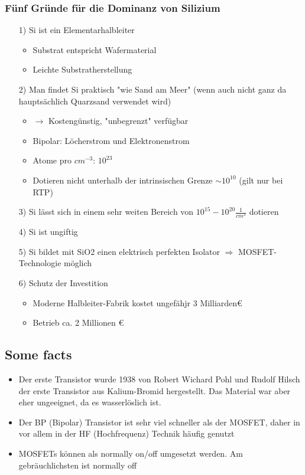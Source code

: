 \documentclass[12pt,a4paper]{report}%
\numberwithin{equation}{section}
\def\€{\euro{}}
\numberwithin{equation}{subsection}
\begin{document}
		\subsubsection{Fünf Gründe für die Dominanz von Silizium}
		\begin{itemize}
		  \item[1) ] Si ist ein Elementarhalbleiter
		  \begin{itemize}
		    \item Substrat entspricht Wafermaterial
		    \item Leichte Substratherstellung
		  \end{itemize}
		  \item[2) ] Man findet Si praktisch "wie Sand am Meer" (wenn auch nicht ganz da hauptsächlich Quarzsand verwendet wird)
		  \begin{itemize}
		    \item $\rightarrow$ Kostengünstig, "unbegrenzt" verfügbar
		    \item Bipolar: Löcherstrom und Elektronenstrom
		    \item Atome pro $cm^{-3}$: $10^{23}$
		    \item Dotieren nicht unterhalb der intrinsischen Grenze $\sim 10^{10}$ (gilt nur bei RTP)
		  \end{itemize}
		  \item[3) ] Si lässt sich in einem sehr weiten Bereich von $10^{15} - 10^{20} \frac{1}{cm^3}$ dotieren
		  \item[4) ] Si ist ungiftig
		  \item[5) ] Si bildet mit SiO2 einen elektrisch perfekten Isolator $\Rightarrow$ MOSFET-Technologie möglich
		  \item[6) ] Schutz der Investition
		  \begin{itemize}
		    \item Moderne Halbleiter-Fabrik kostet ungefähjr 3 Milliarden\€
		    \item Betrieb ca. 2 Millionen \€
		  \end{itemize}
		\end{itemize}
		
		\subsection{Some facts}
		\begin{itemize}
		  \item Der erste Transistor wurde 1938 von Robert Wichard Pohl und Rudolf Hilsch der erste Transistor aus Kalium-Bromid hergestellt. Das Material war aber eher ungeeignet, da es wasserlöslich ist.
		  \item Der BP (Bipolar) Transistor ist sehr viel schneller als der MOSFET, daher in vor allem in der HF (Hochfrequenz) Technik häufig genutzt
		  \item MOSFETs können als normally on/off umgesetzt werden. Am gebräuchlichsten ist normally off
		\end{itemize}
		\newpage
	
\end{document}

